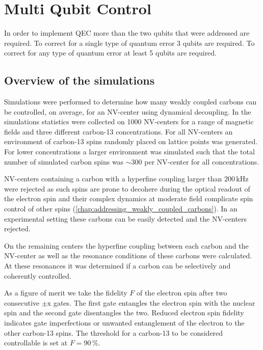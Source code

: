 \section{Multi Qubit Control}
In order to implement QEC more than the two qubits that were addressed are required.
To correct for a single type of quantum error 3 qubits are required.
To correct for any type of quantum error at least 5 qubits are required.


\subsection{Overview of the simulations}
Simulations were performed to determine how many weakly coupled carbons can be controlled, on average, for an NV-center using dynamical decoupling.
In the simulations statistics were collected on 1000 NV-centers for a range of magnetic fields and three different carbon-13 concentrations.
For all NV-centers an environment of carbon-13 spins randomly placed on lattice points was generated.
For lower concentrations a larger environment was simulated such that the total number of simulated carbon spins was $\sim 300$ per NV-center for all concentrations.

NV-centers containing a carbon with a hyperfine coupling larger than $200\,\mathrm{kHz}$ were rejected as such spins are prone to decohere during the optical readout of the electron spin \citep{Pfaff2012Demonstration} and their complex dynamics at moderate field complicate spin control of other spins (\cref{chap:addressing_weakly_coupled_carbons}).
In an experimental setting these carbons can be easily detected and the NV-centers rejected.

On the remaining centers the hyperfine coupling between each carbon and the NV-center as well as the resonance conditions of these carbons were calculated.
At these resonances it was determined if a carbon can be selectively and coherently controlled.

As a figure of merit we take the fidelity $F$ of the electron spin after two consecutive $\pm \mathrm{x}$ gates.
The first gate entangles the electron spin with the nuclear spin and the second gate disentangles the two.
Reduced electron spin fidelity indicates gate imperfections or unwanted entanglement of the electron to the other carbon-13 spins.
The threshold for a carbon-13 to be considered controllable is set at $F = 90 \, \%$.

